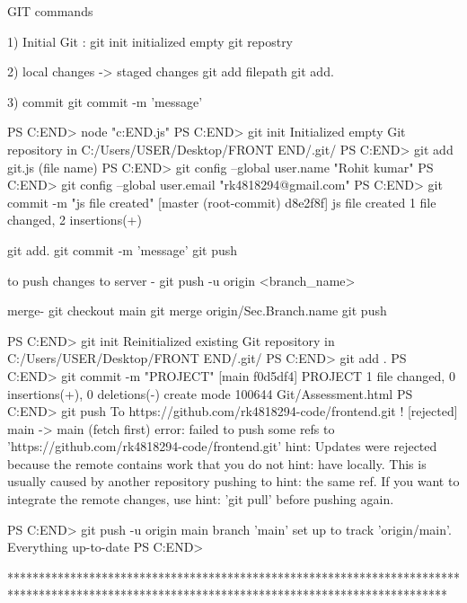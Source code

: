 GIT commands

1) Initial Git :  
git init
initialized  empty git repostry

2) local changes -> staged changes
git add filepath
git add.

3) commit
 git commit -m 'message'


PS C:\Users\USER\Desktop\FRONT END> node "c:\Users\USER\Desktop\FRONT END\git.js"
PS C:\Users\USER\Desktop\FRONT END> git init
Initialized empty Git repository in C:/Users/USER/Desktop/FRONT END/.git/
PS C:\Users\USER\Desktop\FRONT END> git add git.js (file name)
PS C:\Users\USER\Desktop\FRONT END> git config --global user.name "Rohit kumar"
PS C:\Users\USER\Desktop\FRONT END> git config --global user.email "rk4818294@gmail.com"
PS C:\Users\USER\Desktop\FRONT END> git commit -m "js file created"
[master (root-commit) d8e2f8f] js file created
 1 file changed, 2 insertions(+)


git add.
 git commit -m 'message'
 git push



 to push changes to server - git push -u origin <branch_name>

merge-
git checkout main
git merge origin/Sec.Branch.name
git push


PS C:\Users\USER\Desktop\FRONT END> git init
Reinitialized existing Git repository in C:/Users/USER/Desktop/FRONT END/.git/
PS C:\Users\USER\Desktop\FRONT END> git add .
PS C:\Users\USER\Desktop\FRONT END> git commit -m "PROJECT"
[main f0d5df4] PROJECT
 1 file changed, 0 insertions(+), 0 deletions(-)
 create mode 100644 Git/Assessment.html
PS C:\Users\USER\Desktop\FRONT END> git push
To https://github.com/rk4818294-code/frontend.git
 ! [rejected]        main -> main (fetch first)
error: failed to push some refs to 'https://github.com/rk4818294-code/frontend.git'
hint: Updates were rejected because the remote contains work that you do not
hint: have locally. This is usually caused by another repository pushing to
hint: the same ref. If you want to integrate the remote changes, use
hint: 'git pull' before pushing again.

PS C:\Users\USER\Desktop\FRONT END> git push -u origin main
branch 'main' set up to track 'origin/main'.
Everything up-to-date
PS C:\Users\USER\Desktop\FRONT END> 


**********************************************************************************************************************************************

